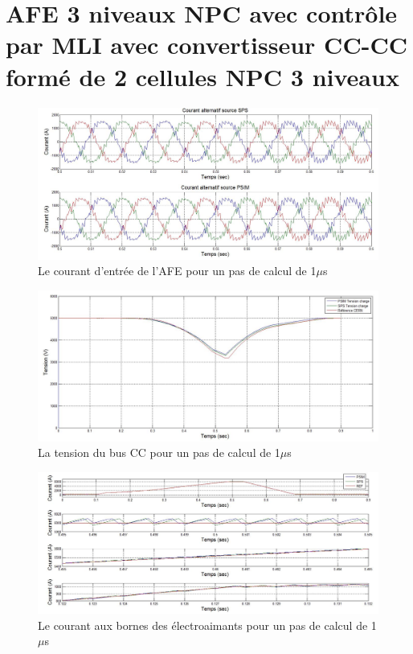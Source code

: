 \section{AFE 3 niveaux NPC avec contrôle par MLI avec convertisseur CC-CC formé de 2 cellules NPC 3 niveaux}

\begin{figure}[htb]
\centering
\includegraphics[scale=0.5]{fig/DCP_AFE/1u/cour_al.jpg}
\caption{Le courant d'entrée de l'AFE pour un pas de calcul de 1$\mu$s}
\label{AF_DC_cou1}
\end{figure}


\begin{figure}[htb]
\centering
\includegraphics[scale=0.5]{fig/DCP_AFE/1u/ten_bus.jpg}
\caption{La tension du bus CC pour un pas de calcul de 1$\mu$s}
\label{AF_DC_vch1}
\end{figure}

\begin{figure}[htb]
\centering
\includegraphics[scale=0.5]{fig/DCP_AFE/1u/cour_ch.jpg}
\caption{Le courant aux bornes des électroaimants pour un pas de calcul de 1$\mu$s}
\label{AF_DC_CHA1}
\end{figure}

